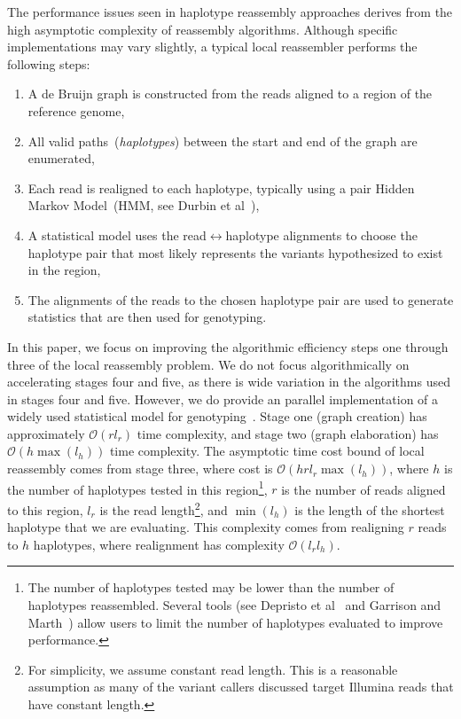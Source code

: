 \documentclass[phd]{ucbthesis}
\begin{document}
The performance issues seen in haplotype reassembly approaches derives from the high asymptotic
complexity of reassembly algorithms. Although specific implementations may vary slightly, a typical
local reassembler performs the following steps:

\begin{enumerate}
\item A de Bruijn graph is constructed from the reads aligned to a region of the reference genome,
\item All valid paths~(\emph{haplotypes}) between the start and end of the graph are enumerated,
\item Each read is realigned to each haplotype, typically using a pair Hidden Markov Model~(HMM,
see Durbin et al~\cite{durbin98}),
\item A statistical model uses the read$\leftrightarrow$haplotype alignments to choose the haplotype pair
that most likely represents the variants hypothesized to exist in the region, 
\item The alignments of the reads to the chosen haplotype pair are used to generate statistics that are
then used for genotyping.
\end{enumerate}

In this paper, we focus on improving the algorithmic efficiency steps one through three of the local reassembly problem.
We do not focus algorithmically on accelerating stages four and five, as there is wide
variation in the algorithms used in stages four and five. However, we do provide an parallel
implementation of a widely used statistical model for genotyping~\cite{li11}. Stage one (graph
creation) has approximately $\mathcal{O}(r l_r)$ time complexity, and stage two (graph elaboration) has
$\mathcal{O}(h \max(l_h))$ time complexity.
The asymptotic time cost bound of local reassembly comes from stage three, where cost is $\mathcal{O}(h r l_r
\max(l_h))$, where $h$ is the number of haplotypes tested in this region\footnote{The number of
haplotypes tested may be lower than the number of haplotypes reassembled. Several tools
(see Depristo et al~\cite{depristo11} and Garrison and Marth~\cite{garrison12}) allow users to limit the number of haplotypes evaluated to improve
performance.}, $r$ is the number of reads aligned to this region, $l_r$ is the read length\footnote{For
simplicity, we assume constant read length. This is a reasonable assumption as many of the variant
callers discussed target Illumina reads that have constant length.}, and $\min(l_h)$ is the length of the
shortest haplotype that we are evaluating. This complexity comes from realigning $r$ reads to $h$
haplotypes, where realignment has complexity $\mathcal{O}(l_r l_h)$.
\end{document}
